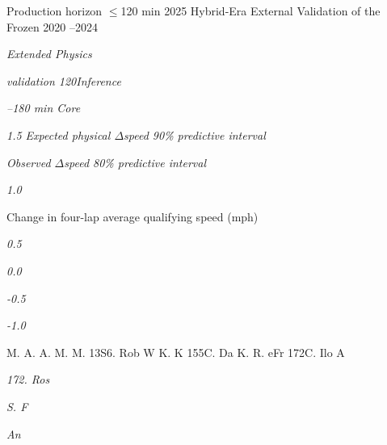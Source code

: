 Production horizon \ensuremath{\le}120 min 2025 Hybrid-Era External Validation of the Frozen 2020 --2024

\begin{center}\textit{Extended     Physics}\end{center}

\begin{center}\textit{validation 120Inference}\end{center}

\begin{center}\textit{--180 min Core}\end{center}

\begin{center}\textit{1.5       Expected physical \ensuremath{\Delta}speed         90\% predictive interval}\end{center}

\begin{center}\textit{Observed \ensuremath{\Delta}speed                  80\% predictive interval}\end{center}

\begin{center}\textit{1.0}\end{center}

Change in four-lap average qualifying speed (mph)

\begin{center}\textit{0.5}\end{center}

\begin{center}\textit{0.0}\end{center}

\begin{center}\textit{-0.5}\end{center}

\begin{center}\textit{-1.0}\end{center}

M. A. A. M. M. 13S6. Rob W K. K 155C. Da K. R. eFr 172C. Ilo A

\begin{center}\textit{172. Ros}\end{center}

\begin{center}\textit{S. F}\end{center}

\begin{center}\textit{An}\end{center}

